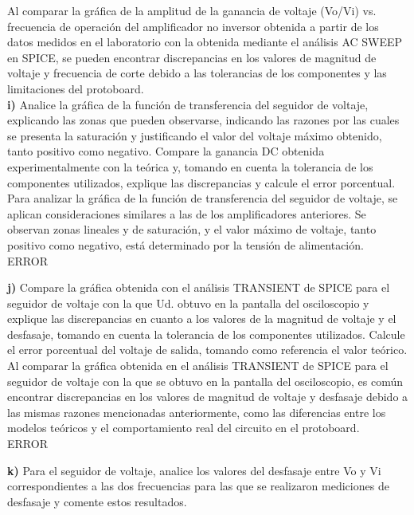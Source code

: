 \documentclass[12pt]{article}
\begin{document}
	Al comparar la gráfica de la amplitud de la ganancia de voltaje (Vo/Vi) vs. frecuencia de operación del amplificador no inversor obtenida a partir de los datos medidos en el laboratorio con la obtenida mediante el análisis AC SWEEP en SPICE, se pueden encontrar discrepancias en los valores de magnitud de voltaje y frecuencia de corte debido a las tolerancias de los componentes y las limitaciones del protoboard.\\
	
	\noindent \textbf{i)} Analice la gráfica de la función de transferencia del seguidor de voltaje, explicando	las zonas que pueden observarse, indicando las razones por las cuales se presenta la saturación y justificando el valor del voltaje máximo obtenido, tanto positivo como	negativo. Compare la ganancia DC obtenida experimentalmente con la teórica y, tomando en cuenta la tolerancia de los componentes utilizados, explique las discrepancias y calcule el error porcentual.\\
	
	Para analizar la gráfica de la función de transferencia del seguidor de voltaje, se aplican consideraciones similares a las de los amplificadores anteriores. Se observan zonas lineales y de saturación, y el valor máximo de voltaje, tanto positivo como negativo, está determinado por la tensión de alimentación.\\
	
	ERROR
	
	\noindent \textbf{j)} Compare la gráfica obtenida con el análisis TRANSIENT de SPICE para el seguidor de voltaje con la que Ud. obtuvo en la pantalla del osciloscopio y explique las discrepancias en cuanto a los valores de la magnitud de voltaje y el desfasaje, tomando	en cuenta la tolerancia de los componentes utilizados. Calcule el error porcentual del	voltaje de salida, tomando como referencia el valor teórico.\\
	
	Al comparar la gráfica obtenida en el análisis TRANSIENT de SPICE para el seguidor de voltaje con la que se obtuvo en la pantalla del osciloscopio, es común encontrar discrepancias en los valores de magnitud de voltaje y desfasaje debido a las mismas razones mencionadas anteriormente, como las diferencias entre los modelos teóricos y el comportamiento real del circuito en el protoboard.\\
	
	ERROR
	
	\noindent \textbf{k)} Para el seguidor de voltaje, analice los valores del desfasaje entre Vo y Vi	correspondientes a las dos frecuencias para las que se realizaron mediciones de desfasaje y comente estos resultados.\\
	
\end{document}
